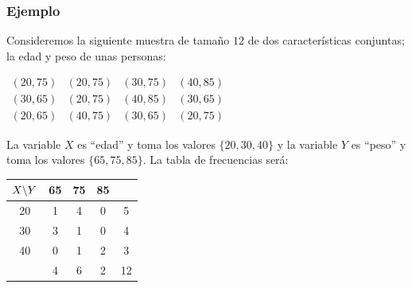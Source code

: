 \begin{frame}
\frametitle{Ejemplo}
Consideremos la siguiente muestra de tamaño $12$  de dos características conjuntas; la
edad y peso de unas personas:

\begin{center}
$
\begin{array}{rrrr}
(20, 75) & (20, 75) & (30,75) & (40,85) \\ (30, 65) & (20, 75) & (40, 85) & (30, 65) \\
(20, 65) & (40, 75) & (30, 65) & (20, 75)
\end{array}
$
\end{center}
\end{frame}

\begin{frame}

La variable $X$ es ``edad'' y toma los valores $\{20,30,40\}$ y la variable $Y$ es
``peso'' y toma los valores $\{65,75,85\}$. La tabla de frecuencias será:

\begin{center}
\begin{tabular}{c|ccc|c}
$X  \mbox{\mbox{\textbackslash}}Y$ & 65 & 75 & 85 &\multicolumn{1}{c}{} \\ \hline 20 & 1 & 4 & 0 & 5\\ 30 & 3 & 1 & 0
& 4 \\ 40 & 0 & 1 & 2 & 3 \\ \hline
  & 4 & 6 & 2 & 12
\end{tabular}
\end{center}
\end{frame}

